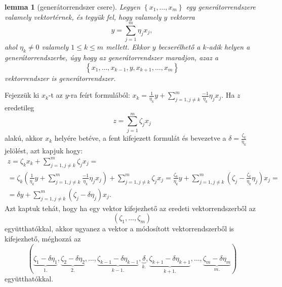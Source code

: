 \documentclass[9pt,showtrims]{memoir}
\makeatletter
\renewenvironment{proof}[1][\proofname]
    {\par\pushQED{\qed}%
    \normalfont \topsep6\p@\@plus6\p@\relax
    \trivlist
    \item[\hskip\labelsep
        \itshape
    #1\@addpunct{:}]\ignorespaces}
    {\popQED\endtrivlist\@endpefalse}
\theoremstyle{plain}
\newtheorem{lemma}[proposition]{lemma}
\theoremstyle{remark}
\theoremstyle{definition}
\makeatother
\begin{document}
\begin{lemma}[generátorrendszer csere]
    Legyen $\left\{ x_1,\dots,x_m \right\}$ egy generátorrendszere valamely vektortérnek,
    és tegyük fel, hogy valamely $y$ vektorra
    \[
        y=\sum_{j=1}^m\eta_jx_j,
    \]
    ahol $\eta_k\neq 0$ valamely $1\leq k\leq m$ mellett. 
    Ekkor $y$ becserélhető a $k$-adik helyen a generátorrendszerbe, 
    úgy hogy az generátorrendszer maradjon, azaz a
    \[
        \left\{ x_1,\dots,x_{k-1},y,x_{k+1},\dots,x_m \right\}
    \]
    vektorrendszer is generátorrendszer.
    \label{le:gencsere}
\end{lemma}
\begin{proof}
    Fejezzük ki $x_k$-t az $y$-ra feírt formulából:
    \(
    x_k=\frac{1}{\eta_k}y+\sum_{j=1,j\neq k}^m\frac{-1}{\eta_k}\eta_jx_j.
    \)
    Ha $z$ eredetileg 
    \[
        z=\sum_{j=1}^m\zeta_jx_j
    \]
    alakú, akkor $x_k$ helyére betéve, a fent kifejezett formulát és bevezetve a 
    $\delta=\frac{\zeta_k}{\eta_k}$ jelölést, azt kapjuk hogy:
    \begin{multline*}
        z=\zeta_kx_k+\sum_{j=1,j\neq k}^m\zeta_jx_j=
        \\
        =
        \zeta_k
        \left( 
        \frac{1}{\eta_k}y+\sum_{j=1,j\neq k}^m\frac{-1}{\eta_k}\eta_jx_j
        \right)
        +\sum_{j=1,j\neq k}^m\zeta_jx_j
        =
        \frac{\zeta_k}{\eta_k}y+
        \sum_{j=1,j\neq k}^m\left( \zeta_j-\frac{\zeta_k}{\eta_k}\eta_j \right)x_j=
        \\
        =\delta y+
        \sum_{j=1,j\neq k}^m\left( \zeta_j-\delta\eta_j \right)x_j.
    \end{multline*}
    Azt kaptuk tehát, hogy ha egy vektor kifejezhető az eredeti vektorrendszerből az 
    \[
        \left( \zeta_1,\dots,\zeta_m \right) 
    \]
    együtthatókkal, akkor ugyanez a vektor a módosított vektorrendszerből is kifejezhető,
    méghozzá az 
    \[
        \left( 
        \underbrace{\zeta_1-\delta\eta_1}_{1.},
        \underbrace{\zeta_2-\delta\eta_2}_{2.},
        \dots,
        \underbrace{\zeta_{k-1}-\delta\eta_{k-1}}_{k-1.},
        \underbrace{\delta}_{k.},
        \underbrace{\zeta_{k+1}-\delta\eta_{k+1}}_{k+1.},\dots,
        \underbrace{\zeta_m-\delta\eta_m}_{m.}
        \right)
    \]
    együtthatókkal.
\end{proof}
\end{document}
